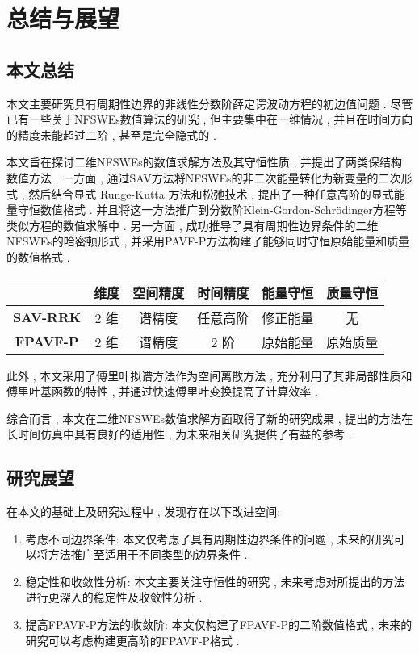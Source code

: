 
\chapter[总结与展望]{总结与展望}
\section{本文总结}
本文主要研究具有周期性边界的非线性分数阶薛定谔波动方程的初边值问题 . 尽管已有一些关于NFSWEs数值算法的研究 , 但主要集中在一维情况 , 并且在时间方向的精度未能超过二阶 , 甚至是完全隐式的 . 

本文旨在探讨二维NFSWEs的数值求解方法及其守恒性质 , 并提出了两类保结构数值方法 . 一方面 , 通过SAV方法将NFSWEs的非二次能量转化为新变量的二次形式 , 然后结合显式 Runge-Kutta 方法和松弛技术 , 提出了一种任意高阶的显式能量守恒数值格式 . 并且将这一方法推广到分数阶Klein-Gordon-Schr{\"o}dinger方程等类似方程的数值求解中 . 另一方面 , 成功推导了具有周期性边界条件的二维NFSWEs的哈密顿形式 , 并采用PAVF-P方法构建了能够同时守恒原始能量和质量的数值格式 . 

\begin{table}[H]
    \centering
      \begin{tabular}{cccccc}
      \toprule
      \textcolor[rgb]{0 , 0 , 0}{} & \textcolor[rgb]{0 , 0 , 0}{\textbf{维度}} & \textcolor[rgb]{0 , 0 , 0}{\textbf{空间精度}} & \textcolor[rgb]{0 , 0 , 0}{\textbf{时间精度}} & \textcolor[rgb]{0 , 0 , 0}{\textbf{能量守恒}} & \textcolor[rgb]{0 , 0 , 0}{\textbf{质量守恒}} \\
      \midrule
      \textcolor[rgb]{0 , 0 , 0}{\textbf{SAV-RRK}} & {2 维}   &{谱精度}   & {任意高阶}  & 修正能量  & 无 \\
      \midrule
      \textcolor[rgb]{0 , 0 , 0}{\textbf{FPAVF-P}} & {2 维}   & {谱精度}   & 2 阶   & {原始能量}  & {原始质量} \\
      \bottomrule
      \end{tabular}%
    \label{tab:3}%
  \end{table}%

此外 , 本文采用了傅里叶拟谱方法作为空间离散方法 , 充分利用了其非局部性质和傅里叶基函数的特性 , 并通过快速傅里叶变换提高了计算效率 . 

综合而言 , 本文在二维NFSWEs数值求解方面取得了新的研究成果 , 提出的方法在长时间仿真中具有良好的适用性 , 为未来相关研究提供了有益的参考 . 

\section{研究展望}
在本文的基础上及研究过程中 , 发现存在以下改进空间:

\begin{enumerate}[(1)]
    \item 考虑不同边界条件: 本文仅考虑了具有周期性边界条件的问题 , 未来的研究可以将方法推广至适用于不同类型的边界条件 .
    \item 稳定性和收敛性分析: 本文主要关注守恒性的研究 , 未来考虑对所提出的方法进行更深入的稳定性及收敛性分析 . 
    \item 提高FPAVF-P方法的收敛阶: 本文仅构建了FPAVF-P的二阶数值格式 , 未来的研究可以考虑构建更高阶的FPAVF-P格式 . 
\end{enumerate}
